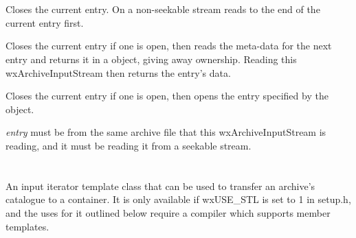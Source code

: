 
\\
\\



\label{wxarchiveinputstreamcloseentry}


Closes the current entry. On a non-seekable stream reads to the end of
the current entry first.


\label{wxarchiveinputstreamgetnextentry}


Closes the current entry if one is open, then reads the meta-data for
the next entry and returns it in a 
object, giving away ownership. Reading this wxArchiveInputStream then
returns the entry's data.


\label{wxarchiveinputstreamopenentry}


Closes the current entry if one is open, then opens the entry specified
by the  object.

{\it entry} must be from the same archive file that this
wxArchiveInputStream is reading, and it must be reading it from a
seekable stream.




%
%

\section{}\label{wxarchiveiterator}

An input iterator template class that can be used to transfer an archive's
catalogue to a container. It is only available if wxUSE\_STL is set to 1
in setup.h, and the uses for it outlined below require a compiler which
supports member templates.

